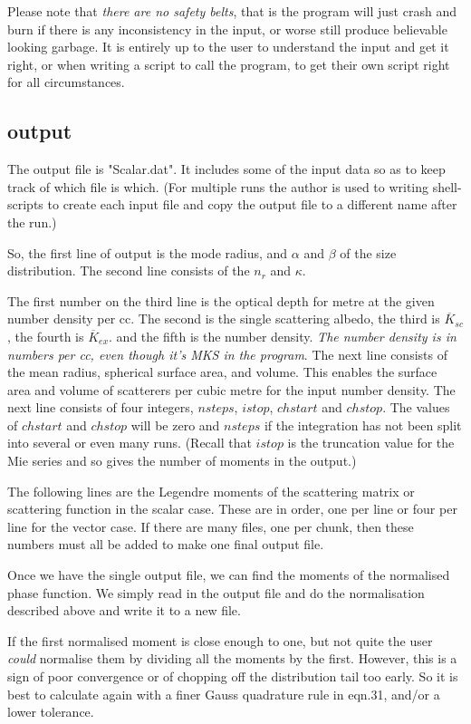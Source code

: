 \documentclass[12pt]{article}
\begin{document}
\begin{flushleft}
Please note that {\it there are no safety belts}, that is the program will just
crash and burn if there is any inconsistency in the input, or worse still
 produce believable looking garbage. It is entirely up to the user to 
understand the input 
and get it right, or when writing a script to call the program, to get their own script
right for all circumstances.

\subsection{output}

The output file is "Scalar.dat". It includes some of the 
input data so as to keep track of which file is which. (For multiple
runs the author is used to writing shell-scripts to create each input file
and copy the output file to a different name after the run.)

So, the first line of output is the mode radius, and $\alpha$ and $\beta$ 
of the size distribution. The second line consists of the $n_r$ and $\kappa$.

The first number on the third line is the optical depth for metre at
the given number density per cc. The second is the single scattering albedo,
the third is ${\overline K_{sc}}$, the fourth is ${\overline K_{ex}}$.
and the fifth is the number density. {\it The number density is
 in numbers per cc, even though it's MKS in the program}.
The next line consists of the mean radius, spherical surface area, and volume.
This enables the surface area and volume of scatterers per cubic metre 
for the input number density.
The next line consists of four integers, $nsteps$, $istop$, $chstart$ and $chstop$.
The values of $chstart$ and $chstop$ will be zero and $nsteps$ if the integration
has not been split into several or even many runs. (Recall that $istop$ is the 
truncation value for the Mie series and so gives the number of moments in 
the output.)

The following lines are the Legendre moments of the scattering matrix
or scattering function in the scalar case.  These are in order, one per 
line or four per line for the vector case.
 If there are many files, one per chunk,
then these numbers must all be added to make one final output file.

Once we have the single output file, we can find the moments
of the normalised phase function. We simply read in the output file
and do the normalisation described above and write it to a new file.

If the first normalised moment is close enough to one, but not quite 
the user {\it could} normalise them by dividing all the moments by the first.
However, this is a sign of poor convergence or of chopping off the distribution
tail too early. So it is best to  calculate again with a finer Gauss quadrature 
rule in eqn.31, and/or a lower tolerance.


\end{flushleft}
\end{document}
